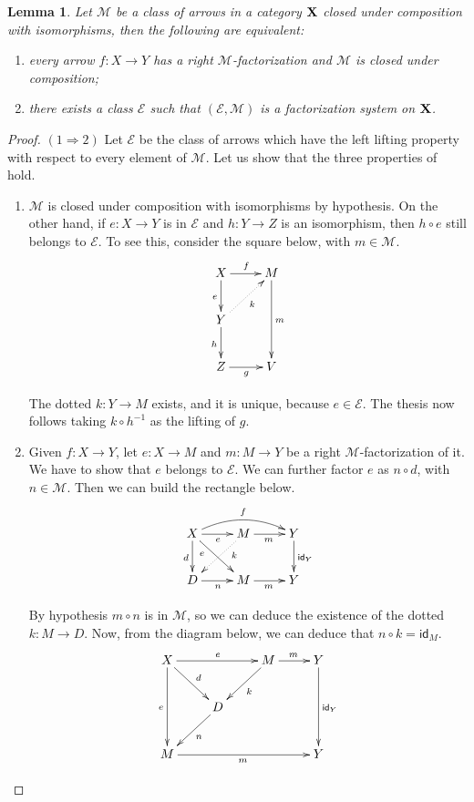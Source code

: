 \documentclass[a4paper]{article}
\newcommand{\id}[1]{\mathsf{id}_{#1}}
\def\X{\textbf {\textup{X}}}
\def\Y{\textbf {\textup{Y}}}
\newtheorem{lemma}[theorem]{Lemma}
\theoremstyle{definition}
\begin{document}
\begin{lemma}\label{lem:fact}Let $\mathcal{M}$ be a class of arrows in a category $\X$ closed under composition with isomorphisms, then the following are equivalent:
	\begin{enumerate}
		\item every arrow $f\colon X\to Y$ has a right $\mathcal{M}$-factorization and $\mathcal{M}$ is closed under composition;
		\item there exists a class $\mathcal{E}$ such that $(\mathcal{E}, \mathcal{M})$ is a factorization system on $\X$.
	\end{enumerate}
\end{lemma}
\begin{proof} $(1\Rightarrow 2)$ Let $\mathcal{E}$ be the class of arrows which have the left lifting property with respect to every element of $\mathcal{M}$. Let us show that the three properties of  hold.
	
	\begin{enumerate}
		\item $\mathcal{M}$ is closed under composition with isomorphisms by hypothesis. On the other hand, if $e\colon X\to Y$ is in $\mathcal{E}$ and $h\colon Y \to Z$ is an isomorphism, then $h\circ e$ still belongs to $\mathcal{E}$. To see this, consider the square below, with $m\in \mathcal{M}$.
		\[\xymatrix{X\ar[r]^{f} \ar[d]_{e}& M\ar[dd]^{m}  \\Y \ar@{.>}[ur]_{k}\ar[d]_h \\Z \ar[r]_{g}& V}\]
		
		The dotted $k\colon Y\to M$ exists, and it is unique, because $e\in \mathcal{E}$. The thesis now follows taking $k\circ h^{-1}$ as the lifting of $g$. 
		
		\item Given $f\colon X\to Y$, let $e\colon X\to M$ and $m\colon M\to Y$ be a right $\mathcal{M}$-factorization of it. We have to show that $e$ belongs to $\mathcal{E}$. We can further factor $e$ as $n\circ d$, with $n\in \mathcal{M}$. Then we can build the rectangle below.
		\[\xymatrix{X  \ar[dr]_(.3){e}\ar[d]_{d} \ar@/^.4cm/[rr]^{f}\ar[r]_{e} & M \ar@{.>}[dl]^(.3){k} \ar[r]_{m} & Y \ar[d]^{\id{Y}}\\
			D \ar[r]_{n} & M \ar[r]_{m}& Y}\]
		
		By hypothesis $m\circ n$ is in $\mathcal{M}$, so we can deduce the existence of the dotted $k\colon M\to D$.   Now, from the diagram below, we can deduce that $n\circ k=\id{M}$.
		\[\xymatrix{X \ar[rr]^{e} \ar[dr]^{d}\ar[dd]_{e}& &M \ar[r]^{m}\ar[dl]^{k}& Y \ar[dd]^{\id{Y}}\\ & D\ar[dl]^{n}\\M\ar[rrr]_{m}&&&Y}\]
		

\end{enumerate}
\end{proof}
\end{document}
